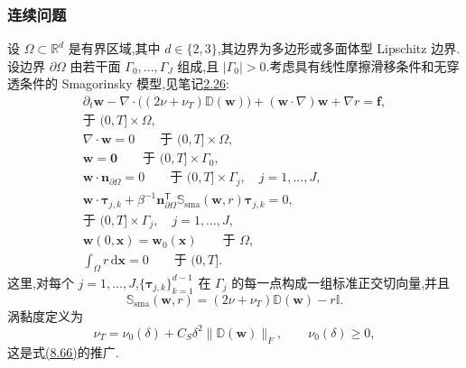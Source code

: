 \subsubsection{连续问题}
\label{subsubsec:smagorinsky-continuous-problem}

\begin{note}[问题的强形式]
\label{note:smagorinsky-generalized-strong-form}
设 $\Omega\subset\mathbb{R}^d$ 是有界区域,其中 $d\in\{2,3\}$,其边界为多边形或多面体型 Lipschitz 边界.设边界 $\partial\Omega$ 由若干面 $\Gamma_0,\ldots,\Gamma_J$ 组成,且 $|\Gamma_0|>0$.考虑具有线性摩擦滑移条件和无穿透条件的 Smagorinsky 模型,见笔记\hyperref[note:slip-boundary-conditions]{2.26}:
\begin{equation}\label{eq:smagorinsky-generalized-strong-form}
\begin{gathered}
 \partial_t\bm{w}
  -\nabla\cdot\bigl((2\nu+\nu_T)\mathbb{D}(\bm{w})\bigr)
  +(\bm{w}\cdot\nabla)\bm{w}+\nabla r=\bm{f},\\
 \text{于 }(0,T]\times\Omega,\\
 \nabla\cdot\bm{w}=0
  \qquad\text{于 }(0,T]\times\Omega,\\
 \bm{w}=\bm{0}
  \qquad\text{于 }(0,T]\times\Gamma_0,\\
 \bm{w}\cdot\bm{n}_{\partial\Omega}=0
  \qquad\text{于 }(0,T]\times\Gamma_j,\quad j=1,\ldots,J,\\
 \bm{w}\cdot\symbf{\tau}_{j,k}
  +\beta^{-1}\bm{n}_{\partial\Omega}^{\mathsf T}
      \mathbb{S}_{\mathrm{sma}}(\bm{w},r)\symbf{\tau}_{j,k}=0,\\
 \text{于 }(0,T]\times\Gamma_j,\quad j=1,\ldots,J,\\
 \bm{w}(0,\bm{x})=\bm{w}_0(\bm{x})
  \qquad\text{于 }\Omega,\\
 \int_\Omega r\,\mathrm{d}\bm{x}=0
  \qquad\text{于 }(0,T].
\end{gathered}
\end{equation}
这里,对每个 $j=1,\ldots,J$,$\{\symbf{\tau}_{j,k}\}_{k=1}^{d-1}$ 在 $\Gamma_j$ 的每一点构成一组标准正交切向量,并且
\[
 \mathbb{S}_{\mathrm{sma}}(\bm{w},r)
   =(2\nu+\nu_T)\mathbb{D}(\bm{w})-r\mathbb{I}.
\]
涡黏度定义为
 \[
 \nu_T=\nu_0(\delta)+C_S\delta^2
       \|\mathbb{D}(\bm{w})\|_F,
 \qquad \nu_0(\delta)\ge0,
 \]
这是式\hyperref[eq:smagorinsky-turbulent-viscosity]{(8.66)}的推广.
\end{note}

